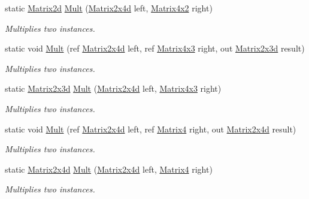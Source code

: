 \begin{DoxyCompactItemize}
static \hyperlink{struct_open_t_k_1_1_matrix2d}{Matrix2d} \hyperlink{struct_open_t_k_1_1_matrix2x4d_a9541e4742605a6afe2b77c42457c4711}{Mult} (\hyperlink{struct_open_t_k_1_1_matrix2x4d}{Matrix2x4d} left, \hyperlink{struct_open_t_k_1_1_matrix4x2}{Matrix4x2} right)
\begin{DoxyCompactList}\small\item\em Multiplies two instances. \end{DoxyCompactList}\item 
static void \hyperlink{struct_open_t_k_1_1_matrix2x4d_acfd012ba1b48ff14486ddc14b49e4263}{Mult} (ref \hyperlink{struct_open_t_k_1_1_matrix2x4d}{Matrix2x4d} left, ref \hyperlink{struct_open_t_k_1_1_matrix4x3}{Matrix4x3} right, out \hyperlink{struct_open_t_k_1_1_matrix2x3d}{Matrix2x3d} result)
\begin{DoxyCompactList}\small\item\em Multiplies two instances. \end{DoxyCompactList}\item 
static \hyperlink{struct_open_t_k_1_1_matrix2x3d}{Matrix2x3d} \hyperlink{struct_open_t_k_1_1_matrix2x4d_a005c7fb4b0c3b595dcd99d4d2e10c282}{Mult} (\hyperlink{struct_open_t_k_1_1_matrix2x4d}{Matrix2x4d} left, \hyperlink{struct_open_t_k_1_1_matrix4x3}{Matrix4x3} right)
\begin{DoxyCompactList}\small\item\em Multiplies two instances. \end{DoxyCompactList}\item 
static void \hyperlink{struct_open_t_k_1_1_matrix2x4d_ab7c587b8072eec7d5b655cc593ce6eae}{Mult} (ref \hyperlink{struct_open_t_k_1_1_matrix2x4d}{Matrix2x4d} left, ref \hyperlink{struct_open_t_k_1_1_matrix4}{Matrix4} right, out \hyperlink{struct_open_t_k_1_1_matrix2x4d}{Matrix2x4d} result)
\begin{DoxyCompactList}\small\item\em Multiplies two instances. \end{DoxyCompactList}\item 
static \hyperlink{struct_open_t_k_1_1_matrix2x4d}{Matrix2x4d} \hyperlink{struct_open_t_k_1_1_matrix2x4d_a430312ade9948c0dd7ce3b9e6ea68fab}{Mult} (\hyperlink{struct_open_t_k_1_1_matrix2x4d}{Matrix2x4d} left, \hyperlink{struct_open_t_k_1_1_matrix4}{Matrix4} right)
\begin{DoxyCompactList}\small\item\em Multiplies two instances. \end{DoxyCompactList}\item 

\end{DoxyCompactItemize}
